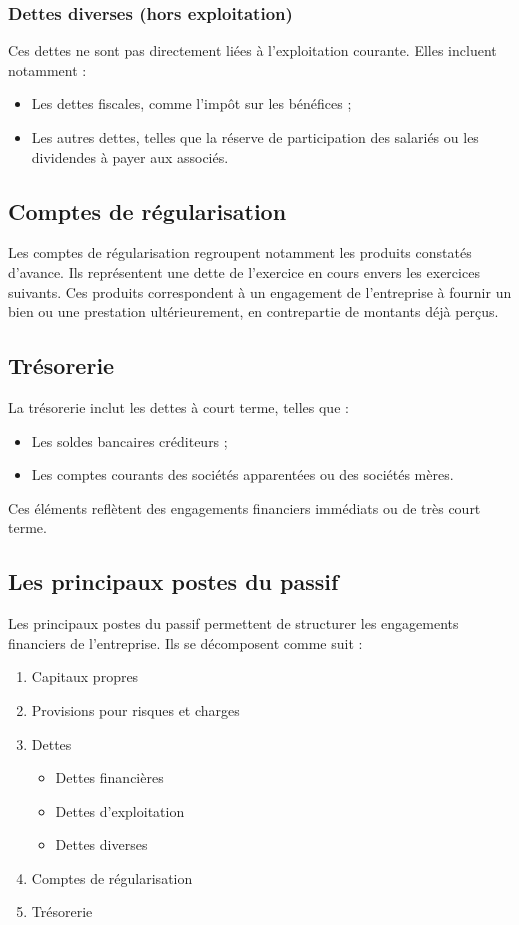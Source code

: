 \documentclass[a4paper, 12pt]{report}
\begin{document}
\subsubsection{Dettes diverses (hors exploitation)}

Ces dettes ne sont pas directement liées à l’exploitation courante. Elles incluent notamment :  

\begin{itemize}
	\item Les dettes fiscales, comme l’impôt sur les bénéfices ;  
	\item Les autres dettes, telles que la réserve de participation des salariés ou les dividendes à payer aux associés.   
\end{itemize}

\subsection{Comptes de régularisation}

Les comptes de régularisation regroupent notamment les produits constatés d'avance. Ils représentent une dette de l'exercice en cours envers les exercices suivants. Ces produits correspondent à un engagement de l'entreprise à fournir un bien ou une prestation ultérieurement, en contrepartie de montants déjà perçus.

\subsection{Trésorerie}

La trésorerie inclut les dettes à court terme, telles que :  
\begin{itemize}
	\item Les soldes bancaires créditeurs ;  
	\item Les comptes courants des sociétés apparentées ou des sociétés mères.  
\end{itemize}
Ces éléments reflètent des engagements financiers immédiats ou de très court terme.

\subsection{Les principaux postes du passif}

Les principaux postes du passif permettent de structurer les engagements financiers de l'entreprise. Ils se décomposent comme suit : 

\begin{enumerate}
	\item Capitaux propres
	\item Provisions pour risques et charges
	\item Dettes
	\begin{itemize}
		\item Dettes financières
		\item Dettes d'exploitation
		\item Dettes diverses
	\end{itemize}
	\item Comptes de régularisation
	\item Trésorerie
\end{enumerate}
\end{document}
